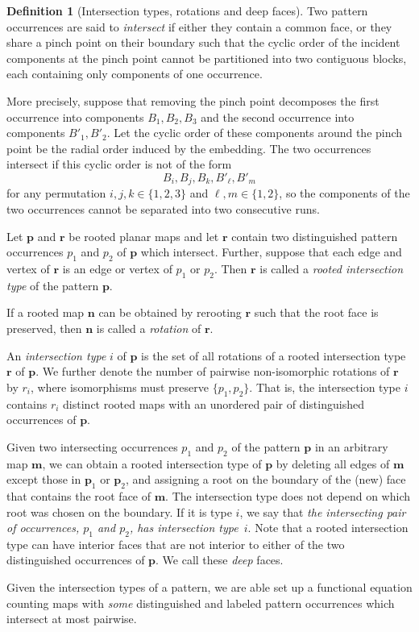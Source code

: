 \documentclass[reqno, 11pt]{amsart}
\theoremstyle{definition}
\newtheorem{definition}{Definition}
\theoremstyle{remark}
\newcommand{\map}[1]{\textbf{#1}}
\numberwithin{equation}{section}
\begin{document}
\begin{definition}[Intersection types, rotations and deep faces]    
   Two pattern occurrences are said to \emph{intersect} if either they contain a common face, or they share a pinch point on their boundary such that the cyclic order of the incident components at the pinch point cannot be partitioned into two contiguous blocks, each containing only components of one occurrence.

    More precisely, suppose that removing the pinch point decomposes the first occurrence into components $B_1,B_2,B_3$ and the second occurrence into components $B'_1,B'_2$. Let the cyclic order of these components around the pinch point be the radial order induced by the embedding. The two occurrences intersect if this cyclic order is not of the form
    \[
        B_i,B_j,B_k,B'_\ell,B'_m
    \]
    for any permutation $i,j,k \in \{1,2,3\}$ and $\ell,m \in \{1,2\}$, so the components of the 
    two occurrences cannot be separated into two consecutive runs.
   
    Let $\map{p}$ and $\map{r}$ be rooted planar maps and let $\map{r}$ contain two distinguished %
    pattern occurrences $p_1$ and $p_2$ of $\map{p}$ which intersect. Further, suppose that each edge and vertex of $\map{r}$ is an edge or vertex of $p_1$ or $p_2$. Then $\map{r}$ is called a \emph{rooted intersection type} of the pattern $\map{p}$.  
   
    \noindent    If  a rooted  map  $\map{n}$ can be obtained by rerooting $\map{r}$ such that the root face is preserved, then $\map{n}$ is called a {\em rotation} of $\map{r}$. 
        
    \noindent    An \emph{intersection type} $i$ of $\map{p}$ is the set of all rotations of a rooted intersection type $\map{r}$ of $\map{p}$. We further denote the number of pairwise non-isomorphic rotations of $\map{r}$ by $r_i$, where isomorphisms must preserve $\{p_1,p_2\}$. That is, the intersection type $i$ contains $r_i$ distinct rooted maps with an unordered pair of distinguished occurrences of $\map{p}$. 
    
    \noindent Given two intersecting occurrences $p_1$ and $p_2$  of the pattern $\map{p}$ in an arbitrary map $\map{m}$, we can obtain a rooted intersection type of $\map{p}$ by deleting all edges of $\map{m}$ except those in $\map{p}_1$ or  $\map{p}_2$, and assigning a root on the boundary of the (new) face that contains the root face of $\map{m}$. The intersection type does not depend on which root was chosen on the boundary. If it is type $i$, we say that {\em the intersecting pair of occurrences, $p_1$ and $p_2$,  has intersection type~$i$}.
    Note  that  a rooted intersection type can have interior faces that are not interior to either of the two distinguished occurrences of $\map{p}$. We call these {\em deep} faces.
\end{definition}
Given the intersection types of a pattern, we are able set up a functional equation counting maps with \emph{some} distinguished and labeled pattern occurrences which intersect at most pairwise. 
\end{document}
